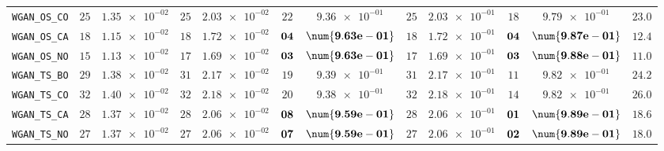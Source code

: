 \begin{table}[H]
\begin{tabularx}{\textwidth}{l||cC|cC|cC|cC|cC||c}
		\texttt{WGAN\_OS\_CO} & $ 25$ & $ \num{1.35e-02}$ & $ 25$ & $ \num{2.03e-02}$ & $ 22$ & $ \num{9.36e-01}$ & $ 25$ & $ \num{2.03e-01}$ & $ 18$ & $ \num{9.79e-01}$ & $ 23.0$  \\
		\texttt{WGAN\_OS\_CA} & $ 18$ & $ \num{1.15e-02}$ & $ 18$ & $ \num{1.72e-02}$ & $\bf 04$ & $\bf \num{9.63e-01}$ & $ 18$ & $ \num{1.72e-01}$ & $\bf 04$ & $\bf \num{9.87e-01}$ & $ 12.4$  \\
		\texttt{WGAN\_OS\_NO} & $ 15$ & $ \num{1.13e-02}$ & $ 17$ & $ \num{1.69e-02}$ & $\bf 03$ & $\bf \num{9.63e-01}$ & $ 17$ & $ \num{1.69e-01}$ & $\bf 03$ & $\bf \num{9.88e-01}$ & $ 11.0$  \\
		\texttt{WGAN\_TS\_BO} & $ 29$ & $ \num{1.38e-02}$ & $ 31$ & $ \num{2.17e-02}$ & $ 19$ & $ \num{9.39e-01}$ & $ 31$ & $ \num{2.17e-01}$ & $ 11$ & $ \num{9.82e-01}$ & $ 24.2$  \\
		\texttt{WGAN\_TS\_CO} & $ 32$ & $ \num{1.40e-02}$ & $ 32$ & $ \num{2.18e-02}$ & $ 20$ & $ \num{9.38e-01}$ & $ 32$ & $ \num{2.18e-01}$ & $ 14$ & $ \num{9.82e-01}$ & $ 26.0$  \\
		\texttt{WGAN\_TS\_CA} & $ 28$ & $ \num{1.37e-02}$ & $ 28$ & $ \num{2.06e-02}$ & $\bf 08$ & $\bf \num{9.59e-01}$ & $ 28$ & $ \num{2.06e-01}$ & $\bf 01$ & $\bf \num{9.89e-01}$ & $ 18.6$  \\
		\texttt{WGAN\_TS\_NO} & $ 27$ & $ \num{1.37e-02}$ & $ 27$ & $ \num{2.06e-02}$ & $\bf 07$ & $\bf \num{9.59e-01}$ & $ 27$ & $ \num{2.06e-01}$ & $\bf 02$ & $\bf \num{9.89e-01}$ & $ 18.0$  \\ \hline

\end{tabularx}
\end{table}
